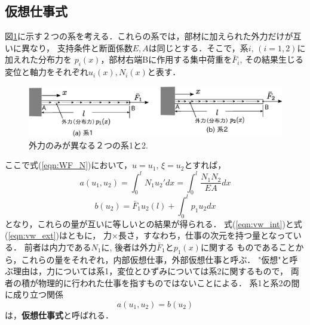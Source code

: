\documentclass[10pt,a4j]{jarticle}
\begin{document}
\subsection{仮想仕事式}
図\ref{fig:fig1_2}に示す２つの系を考える．これらの系では，部材に加えられた外力だけが互いに異なり，
支持条件と断面係数$E,A$は同じとする．そこで，系$i,\, (i=1,2)$に加えれた分布力を
$p_i(x)$，部材右端Bに作用する集中荷重を$\bar F_i$, その結果生じる変位と軸力をそれぞれ$u_i(x), N_i(x)$と表す．
\begin{figure}[h]
	\begin{center}
	\includegraphics[width=0.8\linewidth]{fig1_2.eps} 
	\end{center}
	\caption{外力のみが異なる２つの系1と2.} 
	\label{fig:fig1_2}
\end{figure}
ここで式(\ref{eqn:WF_N})において，$u=u_1$, $\xi=u_2$とすれば，
\begin{equation}
	a(u_1,u_2)=\int_0^l N_1u_2'dx = \int_0^l\frac{N_1N_2}{EA}dx
	\label{eqn:vw_int}
\end{equation}
\begin{equation}
	b(u_2)=\bar F_1 u_2(l)+\int_0^l p_1 u_2dx
	\label{eqn:vw_ext}
\end{equation}
となり，これらの量が互いに等しいとの結果が得られる．
式(\ref{eqn:vw_int})と式(\ref{eqn:vw_ext})はともに，
力$\times$長さ，すなわち，仕事の次元を持つ量となっている．
前者は内力である$N_1$に, 後者は外力$\bar F_1$と$p_1(x)$に関する
ものであることから，これらの量をそれぞれ，内部仮想仕事，外部仮想仕事と呼ぶ．
"仮想"と呼ぶ理由は，力については系1，変位とひずみについては系2に関するもので，
両者の積が物理的に行われた仕事を指すものではないことによる．
系1と系2の間に成り立つ関係
\begin{equation}
	a(u_1,u_2)=b(u_2)
	\label{eqn:vw_eq}
\end{equation}
は，{\bf 仮想仕事式}と呼ばれる．
\end{document}
